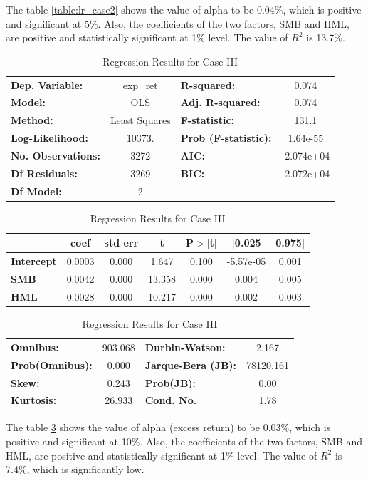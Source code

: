  
The table \ref{table:lr_case2} shows the value of alpha to be 0.04\%, which is positive and significant at 5\%. Also, the coefficients of the two factors, SMB and HML, are positive and statistically significant at 1\% level. The value of $R^2$ is 13.7\%.


\begin{table}
\centering
\begin{tabular}{|lc|lc|}
\hline
\textbf{Dep. Variable:}    &     exp\_ret      & \textbf{  R-squared:         } &     0.074   \\
\textbf{Model:}            &       OLS        & \textbf{  Adj. R-squared:    } &     0.074   \\
\textbf{Method:}           &  Least Squares   & \textbf{  F-statistic:       } &     131.1   \\
\textbf{Log-Likelihood:} &    10373. & \textbf{  Prob (F-statistic):} &  1.64e-55   \\
\textbf{No. Observations:} &        3272      & \textbf{  AIC:               } & -2.074e+04  \\
\textbf{Df Residuals:}     &        3269      & \textbf{  BIC:               } & -2.072e+04  \\
\textbf{Df Model:}         &           2      & \textbf{                     } &             \\
\hline
\end{tabular}

\bigskip

\begin{tabular}{|l|cccccc|}
\hline
                   & \textbf{coef} & \textbf{std err} & \textbf{t} & \textbf{P$>$$|$t$|$} & \textbf{[0.025} & \textbf{0.975]}  \\
\hline
\textbf{Intercept} &       0.0003  &        0.000     &     1.647  &         0.100        &    -5.57e-05    &        0.001     \\
\textbf{SMB}       &       0.0042  &        0.000     &    13.358  &         0.000        &        0.004    &        0.005     \\
\textbf{HML}       &       0.0028  &        0.000     &    10.217  &         0.000        &        0.002    &        0.003     \\
\hline
\end{tabular}

\bigskip

\begin{tabular}{|lc|lc|}
\textbf{Omnibus:}       & 903.068 & \textbf{  Durbin-Watson:     } &     2.167  \\
\textbf{Prob(Omnibus):} &   0.000 & \textbf{  Jarque-Bera (JB):  } & 78120.161  \\
\textbf{Skew:}          &   0.243 & \textbf{  Prob(JB):          } &      0.00  \\
\textbf{Kurtosis:}      &  26.933 & \textbf{  Cond. No.          } &      1.78  \\
\hline
\end{tabular}
\caption{Regression Results for Case III}
\label{table:lr_case3}
\end{table}

The table \ref{table:lr_case3} shows the value of alpha (excess return) to be 0.03\%, which is positive and significant at 10\%. Also, the coefficients of the two factors, SMB and HML, are positive and statistically significant at 1\% level. The value of $R^2$ is 7.4\%, which is significantly low.